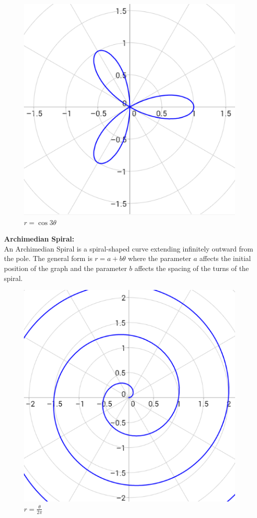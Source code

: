 \documentclass{article}
\begin{document}
            \begin{figure} [hbt!]
                \centering
                \includegraphics[scale=0.4]{Resources/Unit3Vectors/rose.PNG}
                \caption*{$r=\cos{3\theta}$}
            \end{figure}

            \pagebreak
            \noindent \textbf{Archimedian Spiral:} \\
            An Archimedian Spiral is a spiral-shaped curve extending infinitely outward from the pole.
            The general form is $r=a+b\theta$ where the parameter $a$ affects the initial position of
            the graph and the parameter $b$ affects the spacing of the turns of the spiral. \\

            \begin{figure} [hbt!]
                \centering
                \includegraphics[scale=0.4]{Resources/Unit3Vectors/spiral.PNG}
                \caption*{$r=\frac{\theta}{2\pi}$}
            \end{figure}
\end{document}
